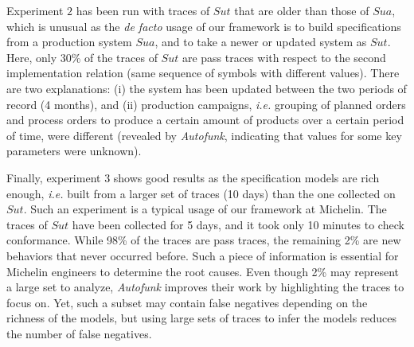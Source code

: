 Experiment $2$ has been run with traces of $\mathit{Sut}$ that
are older than those of $\mathit{Sua}$, which is unusual as the
\emph{de facto} usage of our framework is to build specifications from a
production system $\mathit{Sua}$, and to take a newer or updated
system as $\mathit{Sut}$.  Here, only 30\% of the traces of
$\mathit{Sut}$ are pass traces with respect to the second
implementation relation (same sequence of symbols with different
values). There are two explanations: (i) the system has been
updated between the two periods of record (4 months), and (ii)
production campaigns, \emph{i.e.} grouping of planned orders and
process orders to produce a certain amount of products over a
certain period of time, were different (revealed by
\textit{Autofunk}, indicating that values for some key parameters
were unknown).

Finally, experiment $3$ shows good results as the specification
models are rich enough, \emph{i.e.}  built from a larger set of
traces (10 days) than the one collected on $\mathit{Sut}$. Such
an experiment is a typical usage of our framework at Michelin.
The traces of $\mathit{Sut}$ have been collected for 5 days, and
it took only 10 minutes to check conformance. While 98\% of the
traces are pass traces, the remaining 2\% are new behaviors that
never occurred before. Such a piece of information is essential
for Michelin engineers to determine the root causes. Even though
2\% may represent a large set to analyze, \textit{Autofunk}
improves their work by highlighting the traces to focus on. Yet,
such a subset may contain false negatives depending on the
richness of the models, but using large sets of traces to infer
the models reduces the number of false negatives.
